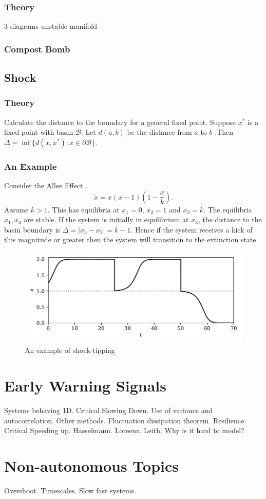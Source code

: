 \subsubsection{Theory}
3 diagrams unstable manifold
\subsubsection{Compost Bomb}
\subsection{Shock}
\subsubsection{Theory}
Calculate the distance to the boundary for a general fixed point. Suppose $x^*$ is a fixed point with basin $\mathcal{B}$. Let $d(a,b)$ be the distance from
$a$ to $b$ .Then $\Delta = \inf \{d(x,x^*) : x \in \partial\mathcal{B}\}$.
\subsubsection{An Example}
Consider the Allee Effect \parencite{Allee1932,Stephens1999}.
\begin{equation}
  \label{eq:allee_effect}
  \dot{x} = x\left(x-1\right)\left(1-\frac{x}{k}\right).
\end{equation}
Assume $k > 1$. This has equilibria at $x_1 = 0$, $x_2 = 1$ and $x_3 = k$. The equilibria $x_1,x_3$ are stable. If the system is
initially in equilibrium at $x_3$, the distance to the basin boundary is $\Delta = |x_3 - x_2| = k - 1$. Hence if the system receives a kick of
this magnitude or greater then the system will transition to the extinction state.

\begin{figure}
  \centering
  \includegraphics{shock}
  \caption{An example of shock-tipping}
  \label{fig:shock_tipping}
\end{figure}


\section{Early Warning Signals}
Systems behaving 1D. Critical Slowing Down. Use of variance and
autocorrelation. Other methods. Fluctuation dissipation theorem.
Resilience. Critical Speeding up. Hasselmann. Loreenz. Leith. 
Why is it hard to model?
\section{Non-autonomous Topics}
Overshoot. Timescales. Slow fast systems.